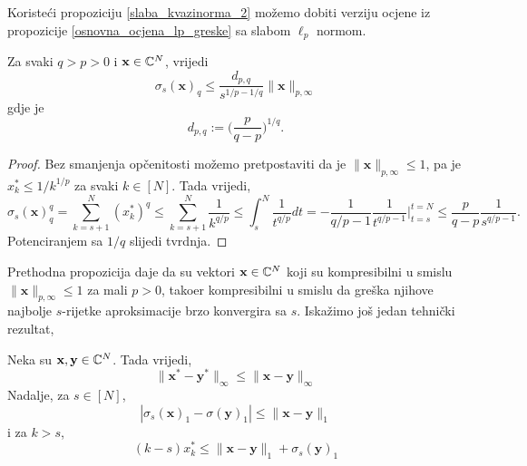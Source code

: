 \documentclass[a4paper,twoside,12pt]{memoir} %
\newcommand{\vect}[1]{\mathbf{#1}}
\newcommand{\norm}[1]{\|{#1}\|}
\begin{document}
Koriste\'ci propoziciju \eqref{slaba_kvazinorma_2} mo\v{z}emo dobiti verziju ocjene iz propozicije \eqref{osnovna_ocjena_lp_greske} sa slabom $\ell_p$ normom.
\begin{prop}
    Za svaki $q>p>0$ i $\vect{x} \in \C^N$, vrijedi
    \begin{equation*}
        \sigma_s(\vect{x})_q \leq \frac{d_{p,q}}{s^{1/p-1/q}}\|\vect{x}\|_{p, \infty}
    \end{equation*}
    gdje je
    \begin{equation*}
        d_{p,q} := \big( \frac{p}{q-p} \big)^{1/q}.
    \end{equation*}
\end{prop}
\begin{proof}
    Bez smanjenja op\v{c}enitosti mo\v{z}emo pretpostaviti da je $\norm{\vect{x}}_{p,\infty} \leq 1$, pa je $x_k^* \leq 1/k^{1/p}$ za svaki $k \in [N]$. Tada vrijedi,
    \begin{equation*}
    \sigma_s(\vect{x})^q_q = \sum_{k=s+1}^{N} (x_k^*)^q \leq \sum_{k=s+1}^N \frac{1}{k^{q/p}} \leq \int_s^N \frac{1}{t^{q/p}} dt = - \frac{1}{q/p-1} \frac{1}{t^{q/p-1}}\bigg\rvert^{t=N}_{t=s} \leq \frac{p}{q-p} \frac{1}{s^{q/p-1}}.
    \end{equation*}
    Potenciranjem sa $1/q$ slijedi tvrdnja.
\end{proof}
Prethodna propozicija daje da su vektori $\vect{x} \in \C^N$ koji su kompresibilni u smislu $\norm{\vect{x}}_{p, \infty} \leq 1$ za mali $p>0$, tako\dj er kompresibilni u smislu da gre\v{s}ka njihove najbolje $s$-rijetke aproksimacije brzo konvergira sa $s$. Iska\v{z}imo jo\v{s} jedan tehni\v{c}ki rezultat,
\begin{lem}
    Neka su $\vect{x}, \vect{y} \in \C^N$. Tada vrijedi,
    \begin{equation} \label{nerastuci_poredak_ocjena_1}
        \norm{\vect{x}^* - \vect{y}^*}_{\infty} \leq \norm{\vect{x} - \vect{y}}_{\infty}
    \end{equation}
    Nadalje, za $s \in [N]$,
    \begin{equation}\label{nerastuci_poredak_ocjena_2}
        |\sigma_s(\vect{x})_1 - \sigma(\vect{y})_1| \leq \norm{\vect{x} - \vect{y}}_1
    \end{equation}
    i za $k>s$,
    \begin{equation}\label{nerastuci_poredak_ocjena_3}
        (k-s)x_k^* \leq \norm{\vect{x} - \vect{y}}_1 + \sigma_s(\vect{y})_1
    \end{equation}
\end{lem}
\end{document}

